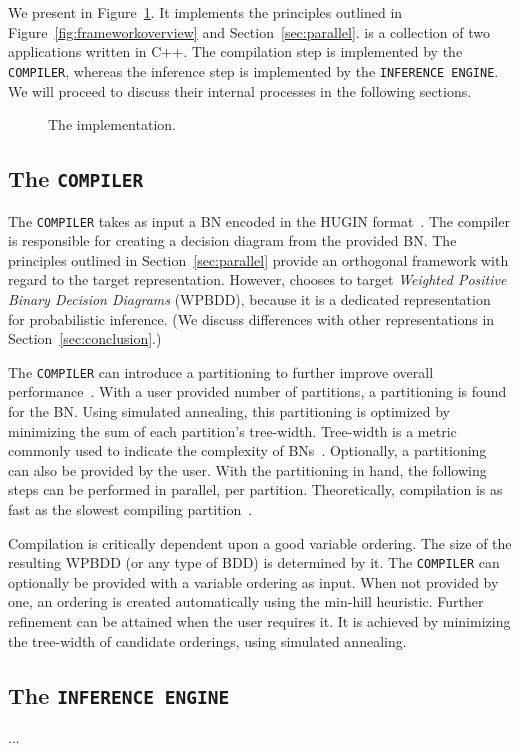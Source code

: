 \section{\toolname}

We present \toolname in Figure~\ref{fig:implementation}. It implements the principles outlined in Figure~\ref{fig:frameworkoverview} and Section~\ref{sec:parallel}. \toolname is a collection of two applications written in C++. The compilation step is implemented by the \verb+COMPILER+, whereas the inference step is implemented by the \verb+INFERENCE ENGINE+. We will proceed to discuss their internal processes in the following sections.

\begin{figure}[!t]
    \centering
    
    \caption{The implementation.}
    \label{fig:implementation}
\end{figure}

\subsection{The \texttt{COMPILER}}

The \verb+COMPILER+ takes as input a BN encoded in the HUGIN format~\cite{madsen2003hugin}. The compiler is responsible for creating a decision diagram from the provided BN. The principles outlined in Section~\ref{sec:parallel} provide an orthogonal framework with regard to the target representation. However, \toolname chooses to target \emph{Weighted Positive Binary Decision Diagrams} (WPBDD), because it is a dedicated representation for probabilistic inference. (We discuss differences with other representations in Section~\ref{sec:conclusion}.)

The \texttt{COMPILER} can introduce a partitioning to further improve overall performance~\cite{dal2017reducing}. With a user provided number of partitions, a partitioning is found for the BN. Using simulated annealing, this partitioning is optimized by minimizing the sum of each partition's tree-width. Tree-width is a metric commonly used to indicate the complexity of BNs~\cite{bollig2014width}. Optionally, a partitioning can also be provided by the user. With the partitioning in hand, the following steps can be performed in parallel, per partition. Theoretically, compilation is as fast as the slowest compiling partition~\cite{dal2018parallel}.

Compilation is critically dependent upon a good variable ordering. The size of the resulting WPBDD (or any type of BDD) is determined by it. The \texttt{COMPILER} can optionally be provided with a variable ordering as input. When not provided by one, an ordering is created automatically using the min-hill heuristic. Further refinement can be attained when the user requires it. It is achieved by minimizing the tree-width of candidate orderings, using simulated annealing.


\subsection{The \texttt{INFERENCE ENGINE}}
...
